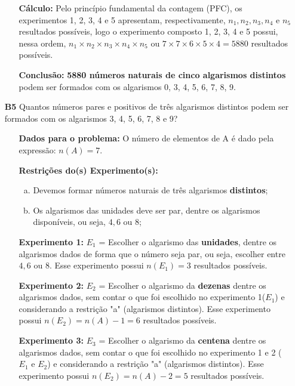 \documentclass[a4paper,12pt]{article}
\begin{document}
\begin{enumerate}
\begin{itemize}
     \item[\ding{178}] \textbf{Cálculo:} Pelo princípio fundamental da contagem (PFC), os experimentos 1, 2, 3, 4 e 5 apresentam, respectivamente, $n_{1}, n_{2}, n_{3}, n_{4} \textrm{ e } n_{5}$ resultados possíveis, logo o experimento composto 1, 2, 3, 4 e 5 possui, nessa ordem, $n_{1} \times n_{2} \times n_{3} \times n_{4} \times n_{5}$ ou $7 \times 7 \times 6 \times 5 \times 4 = 5880$ resultados possíveis.
     \item[\ding{179}] \textbf{Conclusão:} \textbf{5880 números naturais de cinco algarismos distintos} podem ser formados com os algarismos 0, 3, 4, 5, 6, 7, 8, 9. 
   \end{itemize}

\item[\textbf{B5}] Quantos números pares e positivos de três algarismos distintos podem ser formados com os algarismos 3, 4, 5, 6, 7, 8 e 9?
 \begin{itemize}
     \item[\ding{172}] \textbf{Dados para o problema:} O número de elementos de A é dado pela expressão: $n(A)= 7$.
     \item[\ding{173}] \textbf{Restrições do(s) Experimento(s):}
        \begin{enumerate}[a)]
          \item Devemos formar números naturais de três algarismos \textbf{distintos};
          \item Os algarismos das unidades deve ser par, dentre os algarismos disponíveis, ou seja, $4, 6 \textrm{ ou } 8$;          
        \end{enumerate}
     \item[\ding{174}] \textbf{Experimento 1:} $E_1$ = Escolher o algarismo das \textbf{unidades}, dentre os algarismos dados de forma que o número seja par, ou seja, escolher entre $4, 6 \textrm{ ou } 8$. Esse experimento possui $n(E_1) = 3$ resultados possíveis.
     \item[\ding{175}] \textbf{Experimento 2:} $E_2$ = Escolher o algarismo da \textbf{dezenas} dentre os algarismos dados, sem contar o que foi escolhido no experimento 1($E_1$) e considerando a restrição "a" (algarismos distintos). Esse experimento possui $n(E_2) = n(A) - 1 = 6$ resultados possíveis.
     \item[\ding{176}] \textbf{Experimento 3:} $E_3$ = Escolher o algarismo da \textbf{centena} dentre os algarismos dados, sem contar o que foi escolhido no experimento 1 e 2 ($E_1 \textrm{ e } E_2$) e considerando a restrição "a" (algarismos distintos). Esse experimento possui $n(E_2) = n(A) - 2 = 5$ resultados possíveis.

\end{itemize}
\end{enumerate}
\end{document}
